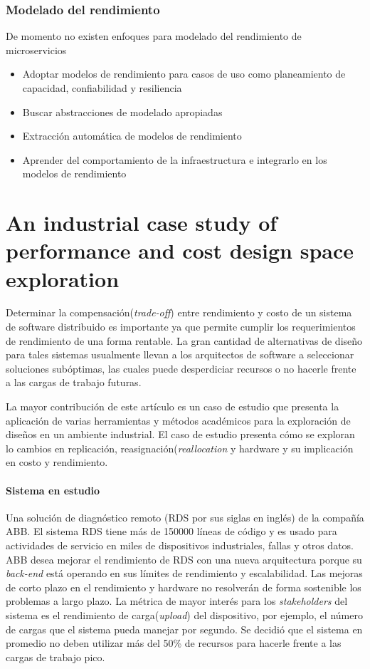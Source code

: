 \subsubsection{Modelado del rendimiento}
De momento no existen enfoques para modelado del rendimiento de microservicios 
\begin{itemize}
    \item Adoptar modelos de rendimiento para casos de uso como planeamiento de capacidad, confiabilidad y resiliencia
    \item Buscar abstracciones de modelado apropiadas 
    \item Extracción automática de modelos de rendimiento
    \item Aprender del comportamiento de la infraestructura e integrarlo en los modelos de rendimiento
\end{itemize}






\newpage
\section{An industrial case study of performance and cost design space exploration\cite{case-study-1}}

Determinar la compensación(\emph{trade-off}) entre rendimiento y costo de un sistema de software distribuido es importante ya que permite cumplir los requerimientos de rendimiento de una forma rentable. La gran cantidad de alternativas de diseño para tales sistemas usualmente llevan a los arquitectos de software a seleccionar soluciones subóptimas, las cuales puede desperdiciar recursos o no hacerle frente a las cargas de trabajo futuras. 

La mayor contribución de este artículo es un caso de estudio que presenta la aplicación de varias herramientas y métodos académicos para la exploración de diseños en un ambiente industrial. El caso de estudio presenta cómo se exploran lo cambios en replicación, reasignación(\emph{reallocation} y hardware y su implicación en costo y rendimiento. 
\paragraph{Sistema en estudio} Una solución de diagnóstico remoto (RDS por sus siglas en inglés) de la compañía ABB. El sistema RDS tiene más de 150000 líneas de código y es usado para actividades de servicio en miles de dispositivos industriales, fallas y otros datos. ABB desea mejorar el rendimiento de RDS con una nueva arquitectura porque su \emph{back-end} está operando en sus límites de rendimiento y escalabilidad. Las mejoras de corto plazo en el rendimiento y hardware no resolverán de forma sostenible los problemas a largo plazo. La métrica de mayor interés para los \emph{stakeholders} del sistema es el rendimiento de carga(\emph{upload}) del dispositivo, por ejemplo, el número de cargas que el sistema pueda manejar por segundo. Se decidió que el sistema en promedio no deben utilizar más del 50\% de recursos para hacerle frente a las cargas de trabajo pico.

